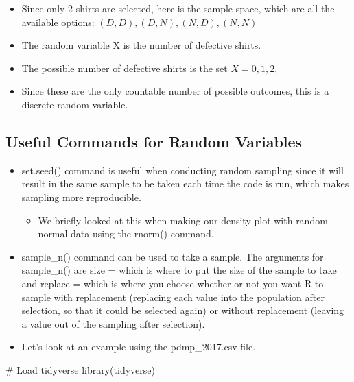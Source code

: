 \documentclass[
  letterpaper,
  DIV=11,
  numbers=noendperiod]{scrreprt}
\newenvironment{Shaded}{\begin{snugshade}}{\end{snugshade}}
\newcommand{\CommentTok}[1]{\textcolor[rgb]{0.37,0.37,0.37}{#1}}
\newcommand{\FunctionTok}[1]{\textcolor[rgb]{0.28,0.35,0.67}{#1}}
\newcommand{\NormalTok}[1]{\textcolor[rgb]{0.00,0.23,0.31}{#1}}
\providecommand{\tightlist}{%
  \setlength{\itemsep}{0pt}\setlength{\parskip}{0pt}}\usepackage{longtable,booktabs,array}
\begin{document}
\begin{itemize}
  \begin{itemize}
  \tightlist
  \item
    Since only 2 shirts are selected, here is the sample space, which
    are all the available options: \({(D,D), (D,N), (N,D), (N,N)}\)
  \item
    The random variable X is the number of defective shirts.
  \item
    The possible number of defective shirts is the set \(X={0,1,2}\),
  \item
    Since these are the only countable number of possible outcomes, this
    is a discrete random variable.
  \end{itemize}
\end{itemize}

\subsection{Useful Commands for Random
Variables}\label{useful-commands-for-random-variables}

\begin{itemize}
\tightlist
\item
  set.seed() command is useful when conducting random sampling since it
  will result in the same sample to be taken each time the code is run,
  which makes sampling more reproducible.

  \begin{itemize}
  \tightlist
  \item
    We briefly looked at this when making our density plot with random
    normal data using the rnorm() command.
  \end{itemize}
\item
  sample\_n() command can be used to take a sample. The arguments for
  sample\_n() are size = which is where to put the size of the sample to
  take and replace = which is where you choose whether or not you want R
  to sample with replacement (replacing each value into the population
  after selection, so that it could be selected again) or without
  replacement (leaving a value out of the sampling after selection).
\item
  Let's look at an example using the pdmp\_2017.csv file.
\end{itemize}

\begin{Shaded}
\begin{Highlighting}[]
\CommentTok{\# Load tidyverse}
\FunctionTok{library}\NormalTok{(tidyverse)}
\end{Highlighting}
\end{Shaded}
\end{document}
